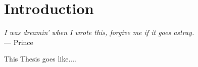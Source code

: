 \chapter{Introduction}\label{ch:introduction} %
\begin{flushright}{\slshape    
    I was dreamin' when I wrote this, forgive me if it goes astray. } \\ \medskip
    --- {Prince}
\end{flushright}


This Thesis goes like.... 



